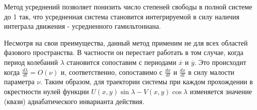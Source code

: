 Метод усреднений позволяет понизить число степеней свободы в полной системе до 1 так, что усредненная система становится интегрируемой в силу наличия интеграла движения - усредненного гамильтониана. 

Несмотря на свои преимущества, данный метод применим не для всех областей фазового пространства. В частности он перестает работать в том случае, когда период колебаний $\lambda$ становится сопоставим с периодами $\overline x$ и $\overline y$. Это происходит когда $\frac{d \lambda}{dt} = O(\nu)$ и, соответственно, сопоставимо с $\frac{dx}{dt}$ и $\frac{dx}{dt}$ в силу малости параметра $\nu$. Таким образом, для траектории системы при каждом прохождении в окрестности нулей функции $U(x,y)\sin \lambda - V(x,y) \cos \lambda$ изменяется значение (квази) адиабатического инварианта действия.
